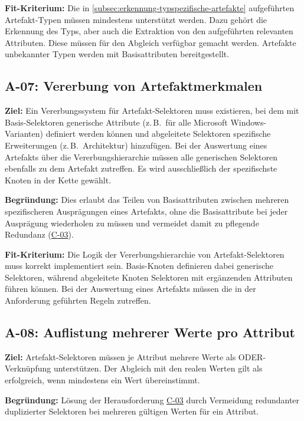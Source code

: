 \textbf{Fit-Kriterium:}
Die in \autoref{subsec:erkennung-typspezifische-artefakte} aufgeführten Artefakt-Typen müssen mindestens unterstützt werden.
Dazu gehört die Erkennung des Typs, aber auch die Extraktion von den aufgeführten relevanten Attributen.
Diese müssen für den Abgleich verfügbar gemacht werden.
Artefakte unbekannter Typen werden mit Basisattributen bereitgestellt.

\subsection{A-07: Vererbung von Artefaktmerkmalen}\label{subsec:req-selektor-inheritance}

\textbf{Ziel:}
Ein Vererbungssystem für Artefakt-Selektoren muss existieren, bei dem mit Basis-Selektoren generische Attribute (z.\,B.\ für alle Microsoft Windows-Varianten) definiert werden können und abgeleitete Selektoren spezifische Erweiterungen (z.\,B.\ Architektur) hinzufügen.
Bei der Auswertung eines Artefakts über die Vererbungshierarchie müssen alle generischen Selektoren ebenfalls zu dem Artefakt zutreffen.
Es wird ausschließlich der spezifischste Knoten in der Kette gewählt.

\textbf{Begründung:}
Dies erlaubt das Teilen von Basisattributen zwischen mehreren spezifischeren Ausprägungen eines Artefakts, ohne die Basisattribute bei jeder Ausprägung wiederholen zu müssen und vermeidet damit zu pflegende Redundanz (\hyperref[subsec:c-03-duplizierte-artefakt-selektoren]{C-03}).

\textbf{Fit-Kriterium:}
Die Logik der Vererbungshierarchie von Artefakt-Selektoren muss korrekt implementiert sein.
Basis-Knoten definieren dabei generische Selektoren, während abgeleitete Knoten Selektoren mit ergänzenden Attributen führen können.
Bei der Auswertung eines Artefakts müssen die in der Anforderung geführten Regeln zutreffen.

\subsection{A-08: Auflistung mehrerer Werte pro Attribut}\label{subsec:req-multiple-attribute-values}

\textbf{Ziel:}
Artefakt-Selektoren müssen je Attribut mehrere Werte als ODER-Verknüpfung unterstützen.
Der Abgleich mit den realen Werten gilt als erfolgreich, wenn mindestens ein Wert übereinstimmt.

\textbf{Begründung:}
Lösung der Herausforderung \hyperref[subsec:c-03-duplizierte-artefakt-selektoren]{C-03} durch Vermeidung redundanter duplizierter Selektoren bei mehreren gültigen Werten für ein Attribut.

